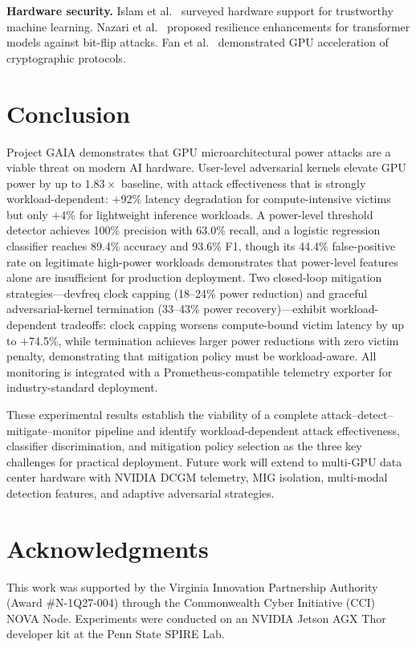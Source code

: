 \documentclass[conference]{IEEEtran}
\begin{document}
\textbf{Hardware security.}
Islam et al.~\cite{islam2024} surveyed hardware support for
trustworthy machine learning.  Nazari et al.~\cite{nazari2024}
proposed resilience enhancements for transformer models against
bit-flip attacks.  Fan et al.~\cite{fan2026} demonstrated GPU
acceleration of cryptographic protocols.

\section{Conclusion}
\label{sec:conclusion}

Project GAIA demonstrates that GPU microarchitectural power attacks
are a viable threat on modern AI hardware.  User-level adversarial
kernels elevate GPU power by up to $1.83\times$ baseline, with
attack effectiveness that is strongly workload-dependent: $+$92\%
latency degradation for compute-intensive victims but only $+$4\% for
lightweight inference workloads.  A power-level threshold detector
achieves 100\% precision with 63.0\% recall, and a logistic regression
classifier reaches 89.4\% accuracy and 93.6\% F1, though its 44.4\%
false-positive rate on legitimate high-power workloads demonstrates
that power-level features alone are insufficient for production
deployment.  Two closed-loop mitigation strategies---devfreq clock
capping (18--24\% power reduction) and graceful adversarial-kernel
termination (33--43\% power recovery)---exhibit workload-dependent
tradeoffs: clock capping worsens compute-bound victim latency by up to
$+$74.5\%, while termination achieves larger power reductions with zero
victim penalty, demonstrating that mitigation policy must be
workload-aware.  All monitoring is integrated with a
Prometheus-compatible telemetry exporter for industry-standard
deployment.

These experimental results establish the viability of a complete
attack--detect--mitigate--monitor pipeline and identify
workload-dependent attack effectiveness, classifier discrimination,
and mitigation policy selection as the three key challenges for
practical deployment.
Future work will extend to multi-GPU data center hardware with NVIDIA
DCGM telemetry, MIG isolation, multi-modal detection features, and
adaptive adversarial strategies.

\section*{Acknowledgments}
This work was supported by the Virginia Innovation Partnership
Authority (Award \#N-1Q27-004) through the Commonwealth Cyber
Initiative (CCI) NOVA Node.
Experiments were conducted on an NVIDIA Jetson AGX Thor developer kit
at the Penn State SPIRE Lab.



\end{document}
